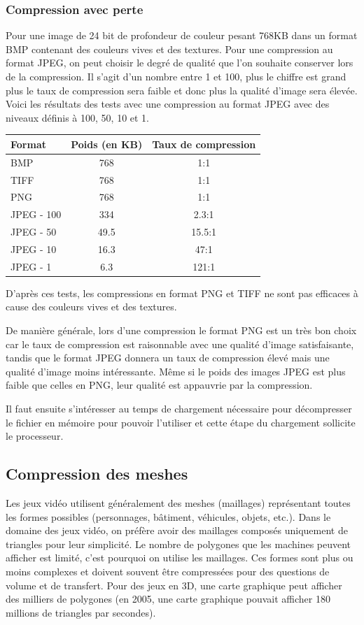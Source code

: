 \documentclass[a4paper, 11pt]{article} %
\begin{document}
\subsubsection{Compression avec perte}

Pour une image de 24 bit de profondeur de couleur pesant 768KB dans un format BMP contenant des couleurs vives et des textures. Pour une compression au format JPEG, on peut choisir le degré de qualité que l'on souhaite conserver lors de la compression. Il s'agit d'un nombre entre 1 et 100, plus le chiffre est grand plus le taux de compression sera faible et donc plus la qualité d'image sera élevée. Voici les résultats des tests avec une compression au format JPEG avec des niveaux définis à 100, 50, 10 et 1.

\begin{center}
	\begin{tabular}{|l|c|c|}
		\hline
		Format & Poids (en KB)& Taux de compression\\
		\hline
		BMP&768&1:1\\
		TIFF&768&1:1\\
		PNG&768&1:1\\
		JPEG - 100&334&2.3:1\\
		JPEG - 50&49.5&15.5:1\\
		JPEG - 10&16.3&47:1\\
		JPEG - 1&6.3&121:1\\
		\hline
	\end{tabular}
\end{center}

D'après ces tests, les compressions en format PNG et TIFF ne sont pas efficaces à cause des couleurs vives et des textures. 

De manière générale, lors d'une compression le format PNG est un très bon choix car le taux de compression est raisonnable avec une qualité d'image satisfaisante, tandis que le format JPEG donnera un taux de compression élevé mais une qualité d'image moins intéressante. Même si le poids des images JPEG est plus faible que celles en PNG, leur qualité est appauvrie par la compression. 

Il faut ensuite s'intéresser au temps de chargement nécessaire pour décompresser le fichier en mémoire pour pouvoir l'utiliser et cette étape du chargement sollicite le processeur.

\subsection{Compression des meshes}
Les jeux vidéo utilisent généralement des meshes (maillages) représentant toutes les formes possibles (personnages, bâtiment, véhicules, objets, etc.). Dans le domaine des jeux vidéo, on préfère avoir des maillages composés uniquement de triangles pour leur simplicité. Le nombre de polygones que les machines peuvent afficher est limité, c'est pourquoi on utilise les maillages. Ces formes sont plus ou moins complexes et doivent souvent être compressées pour des questions de volume et de transfert. Pour des jeux en 3D, une carte graphique peut afficher des milliers de polygones (en 2005, une carte graphique pouvait afficher 180 millions de triangles par secondes)\cite{compression:meshes}.
\end{document}
